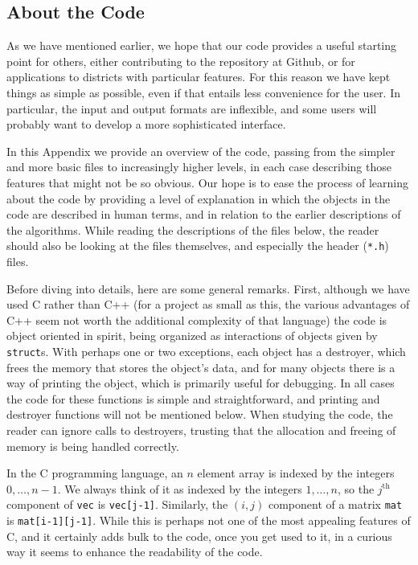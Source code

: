 \documentclass[12pt]{article}
\theoremstyle{definition}
\begin{document}
\newpage

\begin{appendix}

\section{About the Code} \label{app:Code}

As we have mentioned earlier, we hope that our code provides a useful
starting point for others, either contributing to the repository at
Github, or for applications to districts with particular features.
For this reason we have kept things as simple as possible, even if
that entails less convenience for the user.  In particular, the input
and output formats are inflexible, and some users will probably want
to develop a more sophisticated interface.

In this Appendix we provide an overview of the code, passing from the
simpler and more basic files to increasingly higher levels, in each
case describing those features that might not be so obvious.  Our hope
is to ease the process of learning about the code by providing a level
of explanation in which the objects in the code are described in human
terms, and in relation to the earlier descriptions of the algorithms.
While reading the descriptions of the files below, the reader should
also be looking at the files themselves, and especially the header
(\texttt{*.h}) files.

Before diving into details, here are some general remarks.  First,
although we have used C rather than C++ (for a project as small as
this, the various advantages of C++ seem not worth the additional
complexity of that language) the code is object oriented in spirit,
being organized as interactions of objects given by \texttt{struct}s.
With perhaps one or two exceptions, each object has a destroyer, which
frees the memory that stores the object's data, and for many objects
there is a way of printing the object, which is primarily useful for
debugging.  In all cases the code for these functions is simple and
straightforward, and printing and destroyer functions will not be
mentioned below.  When studying the code, the reader can ignore calls
to destroyers, trusting that the allocation and freeing of memory is
being handled correctly.

In the C programming language, an $n$ element array is indexed by the
integers $0, \ldots, n-1$.  We always think of it as indexed by the
integers $1, \ldots, n$, so the $j^{\text{th}}$ component of
\texttt{vec} is \texttt{vec[j-1]}.  Similarly, the $(i,j)$ component
of a matrix \texttt{mat} is \texttt{mat[i-1][j-1]}.  While this is
perhaps not one of the most appealing features of C, and it certainly
adds bulk to the code, once you get used to it, in a curious way it
seems to enhance the readability of the code.


\end{appendix}
\end{document}
